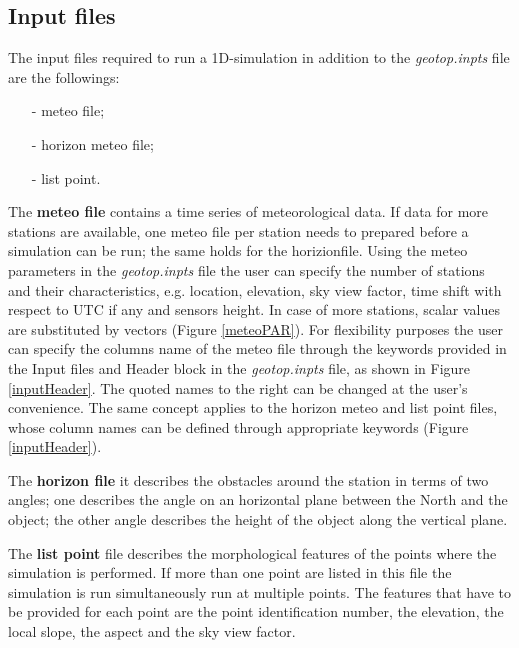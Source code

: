 \subsection{Input files}
The input files required to run a 1D-simulation in addition to the {\it geotop.inpts} file are the followings:
\begin{itemize}
\item [-] meteo file;
\item [-] horizon meteo file;
\item [-] list point.
\end{itemize}
The {\bf meteo file} contains a time series of  meteorological data. If data for more stations are available, one meteo file per station needs to prepared before a simulation can be run; the same holds for the horizionfile. Using the meteo parameters in  the {\it geotop.inpts} file the user can specify the number of stations and their characteristics, e.g. location, elevation, sky view factor, time shift with respect to UTC if any and sensors height. In case of more stations, scalar values are substituted by vectors (Figure \ref{meteoPAR}). For flexibility purposes the user can specify the columns name of the meteo file through the keywords provided in the Input files and Header block in the {\it geotop.inpts} file, as shown in Figure \ref{inputHeader}. The quoted names to the right can be changed at the user's convenience. The same concept applies to the horizon meteo and list point files, whose column names can be defined through appropriate keywords (Figure \ref{inputHeader}).

The {\bf horizon file} it describes the obstacles around the station in terms of two angles; one describes the angle on an horizontal plane between the North and the object; the other angle describes the height of the object along the vertical plane.

The {\bf list point} file describes the morphological features of the points where the simulation is performed. If more than one point are listed in this file the simulation is run simultaneously run at multiple points.  The features that have to be provided for each point are the point identification number, the elevation, the local slope, the aspect and the sky view factor.

